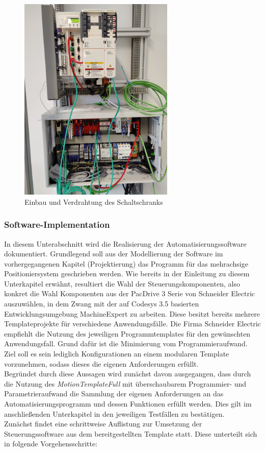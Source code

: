 \documentclass[../../../Bachelorarbeit.tex]{subfiles}
\begin{document}
\begin{figure}[H]
    \centering
    \includegraphics[width=0.66\textwidth]{Images/Schaltschrank.jpg}
    \caption[Schaltschrank]{Einbau und Verdrahtung des Schaltschranks}
    \label{fig:my-img23}
\end{figure}

\subsubsection{Software-Implementation} \label{Softwareimp}
In diesem Unterabschnitt wird die Realisierung der Automatisierungssoftware dokumentiert. Grundlegend soll aus der Modellierung der Software im vorhergegangenen Kapitel (Projektierung) das Programm für das mehrachsige Positioniersystem geschrieben werden. Wie bereits in der Einleitung zu diesem Unterkapitel erwähnt, resultiert die Wahl der Steuerungskomponenten, also konkret die Wahl Komponenten aus der PacDrive 3 Serie von Schneider Electric auszuwählen, in dem Zwang mit der auf Codesys 3.5 basierten Entwicklungsumgebung MachineExpert zu arbeiten. Diese besitzt bereits mehrere Templateprojekte für verschiedene Anwendungsfälle. Die Firma Schneider Electric empfiehlt die Nutzung des jeweiligen Programmtemplates für den gewünschten Anwendungsfall. Grund dafür ist die Minimierung vom Programmieraufwand. Ziel soll es sein lediglich Konfigurationen an einem modularen Template vorzunehmen, sodass dieses die eigenen Anforderungen erfüllt. \\
Begründet durch diese Aussagen wird zunächst davon ausgegangen, dass durch die Nutzung des \textit{MotionTemplateFull} mit überschaubarem Programmier- und Parametrieraufwand die Sammlung der eigenen Anforderungen an das Automatisierungsprogramm und dessen Funktionen erfüllt werden. Dies gilt im anschließenden Unterkapitel in den jeweiligen Testfällen zu bestätigen. \\
Zunächst findet eine schrittweise Auflistung zur Umsetzung der Steuerungssoftware aus dem bereitgestellten Template statt. Diese unterteilt sich in folgende Vorgehensschritte:
\end{document}
